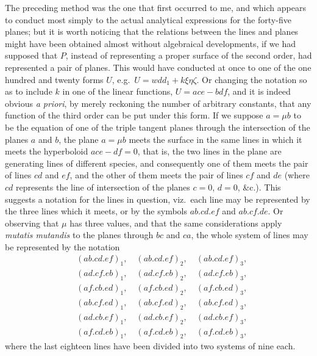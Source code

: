 \documentclass[11pt,a4paper]{book}
\begin{document}
The preceding method was the one that first occurred to me, and which appears to conduct most simply to the actual analytical expressions for the forty-five planes; but it is worth noticing that the relations between the lines and planes might have been obtained almost without algebraical developments, if we had supposed that $P$, instead of representing a proper surface of the second order, had represented a pair of planes. This would have conducted at once to one of the one hundred and twenty forms $U$, e.g.\ $U = wdd_{1} + k\xi\eta\zeta$. Or changing the notation so as to include $k$ in one of the linear functions, $U = ace - bdf$, and it is indeed obvious \textit{a priori}, by merely reckoning the number of arbitrary constants, that any function of the third order can be put under this form. If we suppose $a = \mu b$ to be the equation of one of the triple tangent planes through the intersection of the planes $a$ and $b$, the plane $a = \mu b$ meets the surface in the same lines in which it meets the hyperboloid $ace - df = 0$, that is, the two lines in the plane are generating lines of different species, and consequently one of them meets the pair of lines $cd$ and $ef$, and the other of them meets the pair of lines $cf$ and $de$ (where $cd$ represents the line of intersection of the planes $c = 0$, $d = 0$, \&c.). This suggests a notation for the lines in question, viz.\ each line may be represented by the three lines which it meets, or by the symbols $ab.cd.ef$ and $ab.cf.de$. Or observing that $\mu$ has three values, and that the same considerations apply \textit{mutatis mutandis} to the planes through $bc$ and $ca$, the whole system of lines may be represented by the notation
\begin{align*}
&(ab.cd.ef)_{1}, \quad (ab.cd.ef)_{2}, \quad (ab.cd.ef)_{3}, \\
&(ad.cf.eb)_{1}, \quad (ad.cf.eb)_{2}, \quad (ad.cf.eb)_{3}, \\
&(af.cb.ed)_{1}, \quad (af.cb.ed)_{2}, \quad (af.cb.ed)_{3}, \\
&(ab.cf.ed)_{1}, \quad (ab.cf.ed)_{2}, \quad (ab.cf.ed)_{3}, \\
&(ad.cb.ef)_{1}, \quad (ad.cb.ef)_{2}, \quad (ad.cb.ef)_{3}, \\
&(af.cd.eb)_{1}, \quad (af.cd.eb)_{2}, \quad (af.cd.eb)_{3},
\end{align*}
where the last eighteen lines have been divided into two systems of nine each.

\newpage

\setcounter{page}{452}
\end{document}
